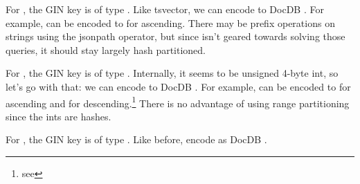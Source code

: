 For , the GIN key is of type .  Like
tsvector, we can encode to DocDB .  For example,
 can be encoded to  for
ascending.  There may be prefix operations on strings using the
 jsonpath operator, but since 
isn't geared towards solving those queries, it should stay largely hash
partitioned.

For , the GIN key is of type .
Internally, it seems to be unsigned 4-byte int, so let's go with that: we can
encode to DocDB .  For example,  can
be encoded to  for ascending and
 for descending.\footnote{see
}  There is no advantage of using range
partitioning since the ints are hashes.

For , the GIN key is of type .  Like
before, encode as DocDB .
